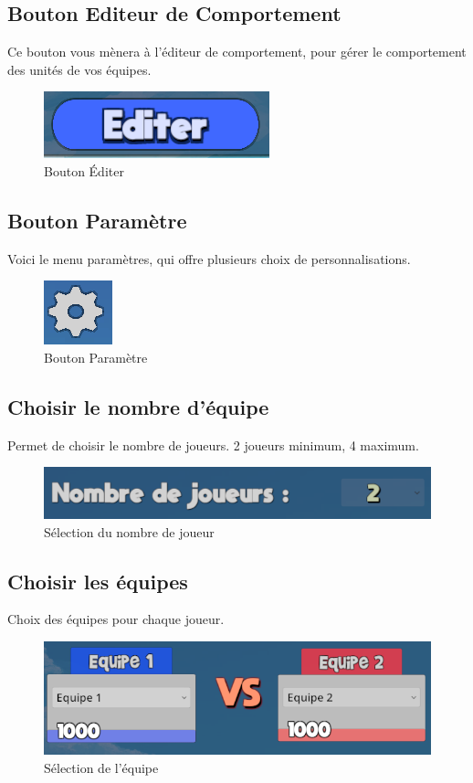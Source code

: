 \documentclass{report}
\begin{document}
\subsection{Bouton Editeur de Comportement}
Ce bouton vous mènera à l’éditeur de comportement, pour gérer le comportement des unités de vos équipes.

\begin{figure}[!h]
	\centering
		\includegraphics[scale=0.80]{Bouton_Editer}
	\caption{Bouton Éditer}
\end{figure}
\subsection{Bouton Paramètre}
Voici le menu paramètres, qui offre plusieurs choix de personnalisations.

\begin{figure}[!h]
	\centering
		\includegraphics[scale=0.80]{Bouton_Parametre}
	\caption{Bouton Paramètre}
\end{figure}
\subsection{Choisir le nombre d'équipe}
Permet de choisir le nombre de joueurs. 2 joueurs minimum, 4 maximum.

\begin{figure}[!h]
	\centering
		\includegraphics[scale=0.60]{Selection_nb_joueurs}
	\caption{Sélection du nombre de joueur}
\end{figure}
\subsection{Choisir les équipes}
Choix des équipes pour chaque joueur.

\begin{figure}[!h]
	\centering
		\includegraphics[scale=0.60]{Selection_Equipes}
	\caption{Sélection de l'équipe}
\end{figure}
\end{document}
